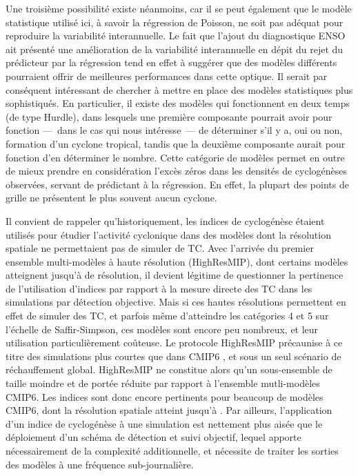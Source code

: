 \documentclass[../main.tex]{subfiles}
\begin{document}
Une troisième possibilité existe néanmoins, car il se peut également que le modèle statistique utilisé ici, à savoir la régression de Poisson, ne soit pas
adéquat pour reproduire la variabilité interannuelle. Le fait que l'ajout du diagnostique ENSO ait présenté une amélioration de la variabilité interannuelle en
dépit du rejet du prédicteur par la régression tend en effet à suggérer que des modèles différents pourraient offrir de meilleures performances dans cette
optique. Il serait par conséquent intéressant de chercher à mettre en place des modèles statistiques plus sophistiqués. En particulier, il existe des modèles
qui fonctionnent en deux temps (de type Hurdle), dans lesquels une première composante pourrait avoir pour fonction ---~dans le cas qui nous intéresse~--- de
déterminer s'il y a, oui ou non, formation d'un cyclone tropical, tandis que la deuxième composante aurait pour fonction d'en déterminer le nombre. Cette
catégorie de modèles permet en outre de mieux prendre en considération l'excès zéros dans les densités de cyclogénèses observées, servant de prédictant à la
régression. En effet, la plupart des points de grille ne présentent le plus souvent aucun cyclone. 

Il convient de rappeler qu'historiquement, les indices de cyclogénèse étaient utilisés pour étudier l'activité cyclonique dans des modèles dont la résolution
spatiale ne permettaient pas de simuler de TC. Avec l'arrivée du premier ensemble multi-modèles à haute résolution (HighResMIP), dont certains modèles
atteignent jusqu'à  de résolution, il devient légitime de questionner la pertinence de l'utilisation d'indices par rapport à la mesure directe des TC
dans les simulations par détection objective. Mais si ces hautes résolutions permettent en effet de simuler des TC, et parfois même d'atteindre les catégories 4
et 5 sur l'échelle de Saffir-Simpson, ces modèles sont encore peu nombreux, et leur utilisation particulièrement coûteuse. Le protocole HighResMIP précaunise à
ce titre des simulations plus courtes que dans CMIP6 \parencite[et plus particulièrement ScenarioMIP,][]{oneill_scenario_2016}, et sous un seul scénario de
réchauffement global. HighResMIP ne constitue alors qu'un sous-ensemble de taille moindre et de portée réduite par rapport à l'ensemble mutli-modèles CMIP6. Les
indices sont donc encore pertinents pour beaucoup de modèles CMIP6, dont la résolution spatiale atteint jusqu'à . Par ailleurs, l'application d'un
indice de cyclogénèse à une simulation est nettement plus aisée que le déploiement d'un schéma de détection et suivi objectif, lequel apporte nécessairement de
la complexité additionnelle, et nécessite de traiter les sorties des modèles à une fréquence sub-journalière.
\end{document}
